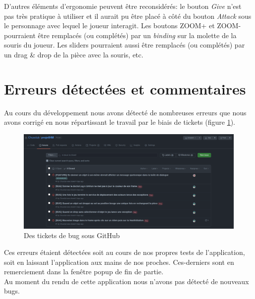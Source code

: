 \documentclass[./standalone.tex]{subfiles}
\begin{document}
D'autres éléments d'ergonomie peuvent être reconsidérés: le bouton \textit{Give} n'est pas très pratique à utiliser et il aurait pu être placé à côté du bouton \textit{Attack} sous le personnage avec lequel le joueur interagit.  Les boutons ZOOM+ et ZOOM- pourraient être remplacés (ou complétés) par un \textit{binding} sur la molette de la souris du joueur. Les sliders pourraient aussi être remplacés (ou complétés) par un drag \& drop de la pièce avec la souris, etc.

\newpage

\section{Erreurs détectées et commentaires}

Au cours du développement nous avons détecté de nombreuses erreurs que nous avons corrigé en nous répartissant le travail par le biais de tickets (figure \ref{tickets}).

\begin{center}
	\begin{figure}[h!]
	\includegraphics[scale=0.25]{images/tickets.png}
	\caption{Des tickets de bug sous GitHub}
	\label{tickets}
	\end{figure}
\end{center}

Ces erreurs étaient détectées soit au cours de nos propres tests de l'application, soit en laissant l'application aux mains de nos proches. Ces-derniers sont en remerciement dans la fenêtre popup de fin de partie.\\

Au moment du rendu de cette application nous n'avons pas détecté de nouveaux bugs.


\newpage
\end{document}
